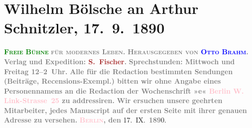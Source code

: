 

               \section[Wilhelm Bölsche an Arthur Schnitzler, 17. 9. 1890]{ Wilhelm Bölsche an Arthur Schnitzler, 17. 9. 1890}\nopagebreak{}\rehead{ }\normalsize\beginnumbering{} \toendnotes[C]{\smallbreak\pagebreak[2]} 
\toendnotes[C]{\smallbreak}\pstart
           \noindent{}\centering{}{\pb}\textcolor{gray}{\textbf{\textsc{\textcolor{green}{Freie Bühne}{}\ledrightnote{\textcolor{green}{Freie Bühne für modernes Leben}}}}}\pend
           \pstart
           \noindent{}\centering{}\textcolor{gray}{\textbf{\textsc{für modernes Leben.}}}\pend
           \pstart
           \noindent{}\centering{}\textcolor{gray}{\textbf{\textsc{Herausgegeben von \textcolor{blue}{\textbf{Otto Brahm}}{}\ledrightnote{\textcolor{blue}{Otto Brahm}}.}}}\pend
           \pstart
           \noindent{}\textcolor{gray}{\textbf{Verlag und Expedition: \textcolor{brown}{S. Fischer}{}\ledrightnote{\textcolor{brown}{S. Fischer Verlag}}.}}\pend
           \pstart
           \textcolor{gray}{\textbf{Sprechstunden: Mittwoch und Freitag 12–2 Uhr.}}\pend
           \pstart
           \textcolor{gray}{\textbf{Alle für die Redaction bestimmten Sendungen (Beiträge,
                            Recensions-Exempl.) bitten wir \textbf{ohne Angabe eines
                                Personennamens} an die Redaction der Wochenschrift »\textcolor{green}{}{}\ledrightnote{\textcolor{green}{Freie Bühne für modernes Leben}}e« \textcolor{pink}{Berlin W. Link-Strasse 25}{}\ledrightnote{\textcolor{pink}{Linkstraße}} zu
                            addressiren.}}\pend
           \pstart
           \textcolor{gray}{\textbf{Wir ersuchen unsere geehrten Mitarbeiter, jedes
                            Manuscript auf der ersten Seite mit ihrer genauen Adresse zu
                            versehen.}}\pend
           \pstart
           \raggedleft{}\textcolor{gray}{\textbf{\textsc{\textcolor{pink}{Berlin}{}\ledrightnote{\textcolor{pink}{Berlin}}}, den}}{ }17. IX. \textcolor{gray}{\textbf{189}}0.\pend

